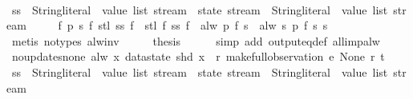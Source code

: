 \begin{isabellebody}
%
\isadelimproof
%
\endisadelimproof
%
\isatagproof
{}\isamarkupfalse%
\ {\isacharminus}\isanewline
\ \ \isamarkupfalse%
\ ss\ {\isacharcolon}{\isacharcolon}\ {\isachardoublequoteopen}{\isacharparenleft}{\isacharparenleft}String{\isachardot}literal\ {\isasymtimes}\ value\ list{\isacharparenright}\ stream\ {\isasymRightarrow}\ state\ stream{\isacharparenright}\ {\isasymRightarrow}\ {\isacharparenleft}String{\isachardot}literal\ {\isasymtimes}\ value\ list{\isacharparenright}\ stream{\isachardoublequoteclose}\ \isanewline
\ \ \ \ {\isachardoublequoteopen}{\isasymforall}f\ p\ s{\isachardot}\ f\ {\isacharparenleft}stl\ {\isacharparenleft}ss\ f{\isacharparenright}{\isacharparenright}\ {\isasymnoteq}\ stl\ {\isacharparenleft}f\ {\isacharparenleft}ss\ f{\isacharparenright}{\isacharparenright}\ {\isasymor}\ alw\ p\ {\isacharparenleft}f\ s{\isacharparenright}\ {\isacharequal}\ alw\ {\isacharparenleft}{\isasymlambda}s{\isachardot}\ p\ {\isacharparenleft}f\ s{\isacharparenright}{\isacharparenright}\ s{\isachardoublequoteclose}\isanewline
\ \ \ \ \isamarkupfalse%
\ {\isacharparenleft}metis\ {\isacharparenleft}no{\isacharunderscore}types{\isacharparenright}\ alw{\isacharunderscore}inv{\isacharparenright}\isanewline
\ \ \isamarkupfalse%
\ \isamarkupfalse%
\ {\isacharquery}thesis\isanewline
\ \ \ \ \isamarkupfalse%
\ {\isacharparenleft}simp\ add{\isacharcolon}\ output{\isacharunderscore}eq{\isacharunderscore}def\ all{\isacharunderscore}imp{\isacharunderscore}alw{\isacharparenright}\isanewline
{}\isamarkupfalse%
%
\endisatagproof
{\isafoldproof}%
%
\isadelimproof
\isanewline
%
\endisadelimproof
\isanewline
{}\isamarkupfalse%
\ no{\isacharunderscore}updates{\isacharunderscore}none{\isacharcolon}\ {\isachardoublequoteopen}alw\ {\isacharparenleft}{\isasymlambda}x{\isachardot}\ datastate\ {\isacharparenleft}shd\ x{\isacharparenright}\ {\isacharequal}\ r{\isacharparenright}\ {\isacharparenleft}make{\isacharunderscore}full{\isacharunderscore}observation\ e\ None\ r\ t{\isacharparenright}{\isachardoublequoteclose}\isanewline
%
\isadelimproof
%
\endisadelimproof
%
\isatagproof
{}\isamarkupfalse%
\ {\isacharminus}\isanewline
\ \ \isamarkupfalse%
\ ss\ {\isacharcolon}{\isacharcolon}\ {\isachardoublequoteopen}{\isacharparenleft}{\isacharparenleft}String{\isachardot}literal\ {\isasymtimes}\ value\ list{\isacharparenright}\ stream\ {\isasymRightarrow}\ state\ stream{\isacharparenright}\ {\isasymRightarrow}\ {\isacharparenleft}String{\isachardot}literal\ {\isasymtimes}\ value\ list{\isacharparenright}\ stream{\isachardoublequoteclose}\ \isanewline

\end{isabellebody}
